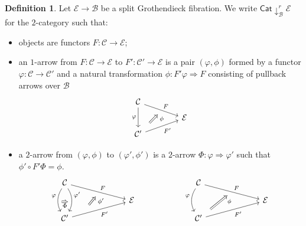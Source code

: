 \documentclass[a4paper,10pt
]{article}%
\numberwithin{equation}{section}
\numberwithin{figure}{section}
\theoremstyle{definition} %
\newtheorem{definition}[equation]{Definition}%
\newcommand{\1}{\ensuremath{\mathbbm 1}}%
\begin{document}
\begin{definition}
	Let $\mathcal{E} \to \mathcal{B}$ be a split Grothendieck fibration.
	We write $\mathsf{Cat}\downarrow^r_{\mathcal{B}} \mathcal{E}$ for the $2$-category such that:
	\begin{itemize}
		\item objects are functors $F \colon \mathcal{C} \to \mathcal{E}$; 
		
		\item an $1$-arrow from 
		$F \colon \mathcal{C} \to \mathcal{E}$
		to
		$F' \colon \mathcal{C}' \to \mathcal{E}$
		is a pair $(\varphi,\phi)$
		formed by a functor $\varphi\colon \mathcal{C} \to \mathcal{C}'$ and a natural transformation $\phi \colon F' \varphi \Rightarrow F$ consisting of pullback arrows over $\mathcal{B}$
		\begin{equation}
		\begin{tikzcd}[row sep = 5pt, column sep = 40pt]
		\mathcal{C} \arrow{dr}[name=U]{F} \arrow{dd}[swap]{\varphi}
		\\
		& \mathcal{E}
		\\
		|[alias=V]| \mathcal{C}' \arrow{ur}[swap]{F'}
		\arrow[Rightarrow, from=V, to=U,shorten >=0.25cm,shorten <=0.25cm
		,swap,near end,"\phi"
		]
		\end{tikzcd}
		\end{equation}
		
		\item a $2$-arrow from $(\varphi,\phi)$ to $(\varphi',\phi')$ is a $2$-arrow $\Phi \colon \varphi \Rightarrow \varphi'$ such that
		$\phi' \circ F' \Phi = \phi$.
		\begin{equation}
		\begin{tikzcd}[column sep = 65pt,row sep = 7pt]
		\mathcal{C} \arrow{dr}[name=U]{F} 
		\arrow[bend right]{dd}[swap]{\varphi}[name=F]{}
		\arrow[bend left]{dd}{\varphi'}[swap,name=FF]{}
		&
		&
		\mathcal{C} \arrow{dr}[name=U2]{F} 
		\arrow[bend right]{dd}[swap]{\varphi}
		&
		\\
		& \mathcal{E}
		&
		& \mathcal{E}
		\\
		\mathcal{C}' \arrow{ur}[swap]{F'}[near start, name=V]{}
		&
		&
		|[alias=V2]| \mathcal{C}' \arrow{ur}[swap]{F'}
		&
		\arrow[Rightarrow, from=V, to=U,shorten >=0.25cm,shorten <=0.25cm
		,swap,near end,"\phi'"
		]
		\arrow[Rightarrow, from=F, to=FF,shorten >=0.0cm,shorten <=0.0cm
		,swap,"\Phi"
		]
		\arrow[Rightarrow, from=V2, to=U2,shorten >=0.25cm,shorten <=0.25cm
		,swap,near end,"\phi"
		]
		\end{tikzcd}
		\end{equation}
	\end{itemize}
\end{definition}
\end{document}
